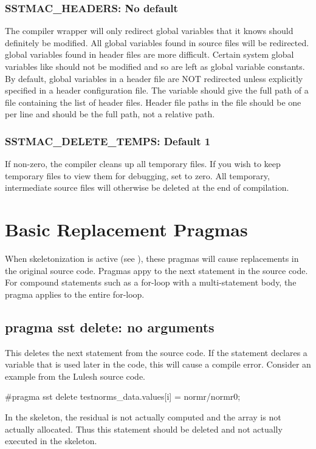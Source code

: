 \subsubsection{SSTMAC\_HEADERS: No default}
The compiler wrapper will only redirect global variables that it knows should definitely be modified.
All global variables found in source files will be redirected.
 global variables found in header files are more difficult.
Certain system global variables like  should not be modified and so are left as global variable constants.
By default, global variables in a header file are NOT redirected unless explicitly specified in a header configuration file.
The variable  should give the full path of a file containing the list of header files.
Header file paths in the file should be one per line and should be the full path, not a relative path.

\subsubsection{SSTMAC\_DELETE\_TEMPS: Default 1}
If non-zero, the compiler cleans up all temporary files. 
If you wish to keep temporary files to view them for debugging, set to zero.
All temporary, intermediate source files will otherwise be deleted at the end of compilation.

\section{Basic Replacement Pragmas}
When skeletonization is active (see ), these pragmas will cause replacements in the original source code.
Pragmas appy to the next statement in the source code.
For compound statements such as a for-loop with a multi-statement body, the pragma applies to the entire for-loop.
\subsection{pragma sst delete: no arguments}
This deletes the next statement from the source code.
If the statement declares a variable that is used later in the code, this will cause a compile error.
Consider an example from the Lulesh source code.

\begin{CppCode}
#pragma sst delete
    testnorms_data.values[i] = normr/normr0;
\end{CppCode}
In the skeleton, the residual is not actually computed and the  array is not actually allocated.
Thus this statement should be deleted and not actually executed in the skeleton.

